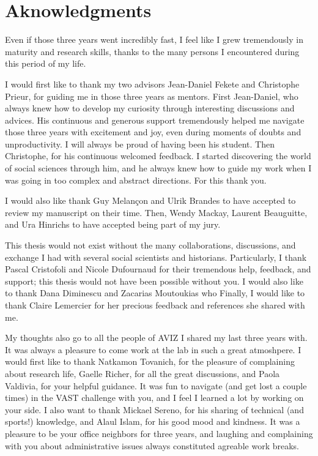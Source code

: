 \chapter*{Aknowledgments}

Even if those three years went incredibly fast, I feel like I grew tremendously in maturity and research skills, thanks to the many persons I encountered during this period of my life.

I would first like to thank my two advisors Jean-Daniel Fekete and Christophe Prieur, for guiding me in those three years as mentors.
First Jean-Daniel, who always knew how to develop my curiosity through interesting discussions and advices. His continuous and generous support tremendously helped me navigate those three years with excitement and joy, even during moments of doubts and unproductivity.
I will always be proud of having been his student.
Then Christophe, for his continuous welcomed feedback. I started discovering the world of social sciences through him, and he always knew how to guide my work when I was going in too complex and abstract directions.
For this thank you.

I would also like thank Guy Melançon and Ulrik Brandes to have accepted to review my manuscript on their time.
Then, Wendy Mackay, Laurent Beauguitte, and Ura Hinrichs to have accepted being part of my jury.

This thesis would not exist without the many collaborations, discussions, and exchange I had with several social scientists and historians.
Particularly, I thank Pascal Cristofoli and Nicole Dufournaud for their tremendous help, feedback, and support; this thesis would not have been possible without you.
I would also like to thank Dana Diminescu and Zacarias Moutoukias who
Finally, I would like to thank Claire Lemercier for her precious feedback and references she shared with me.

My thoughts also go to all the people of AVIZ I shared my last three years with. It was always a pleasure to come work at the lab in such a great atmoshpere.
I would first like to thank Natkamon Tovanich, for the pleasure of complaining about research life, Gaelle Richer, for all the great discussions, and Paola Valdivia, for your helpful guidance.
It was fun to navigate (and get lost a couple times) in the VAST challenge with you, and I feel I learned a lot by working on your side.
I also want to thank Mickael Sereno, for his sharing of technical (and sports!) knowledge, and Alaul Islam, for his good mood and kindness. It was a pleasure to be your office neighbors for three years, and laughing  and complaining with you about administrative issues always constituted agreable work breaks.

